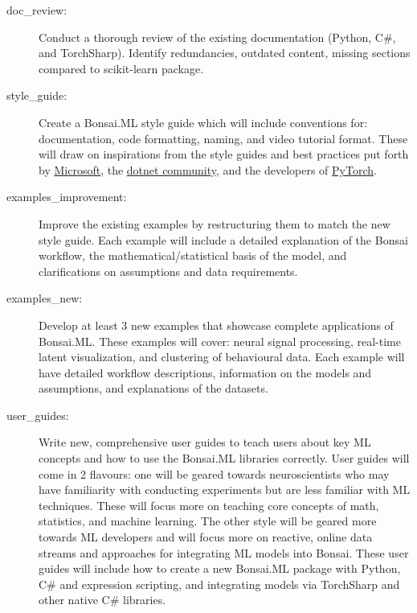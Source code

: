 \begin{description}

    \item[doc\_review:] Conduct a thorough review of the existing documentation (Python, C\#, and TorchSharp). Identify redundancies, outdated content, missing sections compared to scikit-learn package.

    \item[style\_guide:] Create a Bonsai.ML style guide which will include conventions for: documentation, code formatting, naming, and video tutorial format. These will draw on inspirations from the style guides and best practices put forth by \href{https://learn.microsoft.com/en-us/dotnet/csharp/fundamentals/coding-style/coding-conventions}{Microsoft}, the \href{https://github.com/dotnet/runtime/blob/main/docs/coding-guidelines/coding-style.md}{dotnet community}, and the developers of \href{https://github.com/pytorch/pytorch/blob/main/CONTRIBUTING.md}{PyTorch}.
    
    \item[examples\_improvement:] Improve the existing examples by restructuring them to match the new style guide. Each example will include a detailed explanation of the Bonsai workflow, the mathematical/statistical basis of the model, and clarifications on assumptions and data requirements.

    \item[examples\_new:] Develop at least 3 new examples that showcase complete applications of Bonsai.ML. These examples will cover: neural signal processing, real-time latent visualization, and clustering of behavioural data. Each example will have detailed workflow descriptions, information on the models and assumptions, and explanations of the datasets.

    \item[user\_guides:] Write new, comprehensive user guides to teach users about key ML concepts and how to use the Bonsai.ML libraries correctly. User guides will come in 2 flavours: one will be geared towards neuroscientists who may have familiarity with conducting experiments but are less familiar with ML techniques. These will focus more on teaching core concepts of math, statistics, and machine learning. The other style will be geared more towards ML developers and will focus more on reactive, online data streams and approaches for integrating ML models into Bonsai. These user guides will include how to create a new Bonsai.ML package with Python, C\# and expression scripting, and integrating models via TorchSharp and other native C\# libraries.
    

\end{description}
